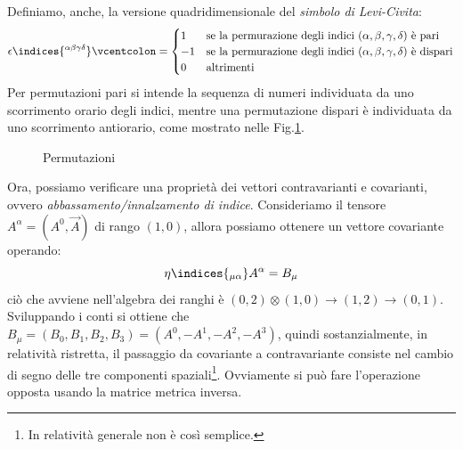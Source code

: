Definiamo, anche, la versione quadridimensionale del \textit{simbolo di Levi-Civita}: 
\begin{equation}
\epsilon\indices{^{\alpha \beta \gamma \delta}}\vcentcolon = 
\begin{cases}
     1 & \mbox{se la permurazione degli indici $(\alpha, \beta, \gamma, \delta)$ è pari}
             \\
    -1 & \mbox{se la permurazione degli indici $(\alpha, \beta, \gamma, \delta)$ è dispari}
    \\
    0 & \mbox{altrimenti}
    \end{cases}
\end{equation}
Per permutazioni pari si intende la sequenza di numeri individuata da uno scorrimento orario degli indici, mentre una permutazione dispari è individuata da uno scorrimento antiorario, come mostrato nelle Fig.\ref{fig:permu}.
\begin{figure}[H]
    \centering
    \qquad
    \caption{Permutazioni}%
    \label{fig:permu}%
\end{figure}

Ora, possiamo verificare una proprietà dei vettori contravarianti e covarianti, ovvero \textit{abbassamento/innalzamento di indice}. Consideriamo il tensore $A^{\alpha}=(A^0, \Vec{A})$ di rango $(1,0)$, allora possiamo ottenere un vettore covariante operando:
\begin{equation*}
\eta\indices{_{\mu\alpha}}A^\alpha=B_\mu
\end{equation*}
ciò che avviene nell'algebra dei ranghi è $(0,2)\otimes(1,0)\rightarrow(1,2)\rightarrow(0,1)$. Sviluppando i conti si ottiene che $B_{\mu}=(B_0,B_1,B_2,B_3)=(A^0,-A^1,-A^2,-A^3)$, quindi sostanzialmente, in relatività ristretta, il passaggio da covariante a contravariante consiste nel cambio di segno delle tre componenti spaziali\footnote{In relatività generale non è così semplice.}.
Ovviamente si può fare l'operazione opposta usando la matrice metrica inversa.

